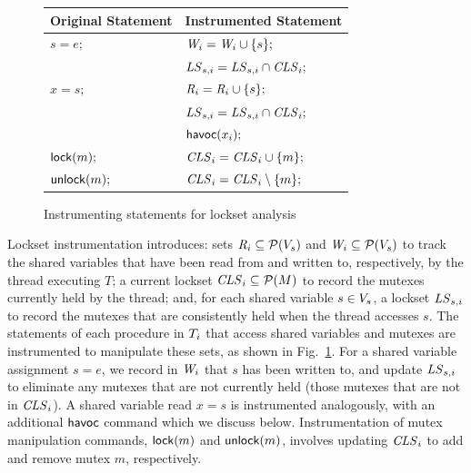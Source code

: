 \begin{figure}
\footnotesize
\center
\begin{tabular}{ll}
\textbf{Original Statement} & \textbf{Instrumented Statement} \\
\toprule

$s = e;$ & $\mathit{W}_{i} = \mathit{W}_{i} \cup \{ s \};$ \\
         & $\mathit{LS}_{s,i} = \mathit{LS}_{s,i} \cap \mathit{CLS}_{i};$ \\
\midrule
         
$x = s;$ & $\mathit{R}_{i} = \mathit{R}_{i} \cup \{ s \};$ \\
         & $\mathit{LS}_{s,i} = \mathit{LS}_{s,i} \cap \mathit{CLS}_{i};$ \\
         & $\mathsf{havoc}({x_{i}});$ \\
\midrule
         
$\mathsf{lock}(m);$   & $\mathit{CLS}_{i} = \mathit{CLS}_{i} \cup \{ m \};$ \\
\midrule

$\mathsf{unlock}(m);$ & $\mathit{CLS}_{i} = \mathit{CLS}_{i} \setminus \{ m \};$ \\
\bottomrule
\end{tabular}
\caption{Instrumenting statements for lockset analysis}
\label{fig:instrumentation}
\end{figure}

Lockset instrumentation introduces: sets $\mathit{R}_{i} \subseteq \mathcal{P}(V_s)$ and $\mathit{W}_{i} \subseteq \mathcal{P}(V_s)$ to track the shared variables that have been read from and written to, respectively, by the thread executing $T$; a current lockset $\mathit{CLS}_{i} \subseteq \mathcal{P}(M)$ to record the mutexes currently held by the thread; and, for each shared variable $s \in V_s$, a lockset $\mathit{LS}_{s,i}$ to record the mutexes that are consistently held when the thread accesses $s$.
%
The statements of each procedure in $T_{i}$ that access shared variables and mutexes are instrumented to manipulate these sets, as shown in Fig.~\ref{fig:instrumentation}.  For a shared variable assignment $s = e$, we record in $\mathit{W}_{i}$ that $s$ has been written to, and update $\mathit{LS}_{s,i}$ to eliminate any mutexes that are not currently held (those mutexes that are not in $\mathit{CLS}_{i}$).  A shared variable read $x = s$ is instrumented analogously, with an additional $\mathsf{havoc}$ command which we discuss below.  Instrumentation of mutex manipulation commands, $\mathsf{lock}(m)$ and $\mathsf{unlock}(m)$, involves updating $\mathit{CLS}_{i}$ to add and remove mutex $m$, respectively.

